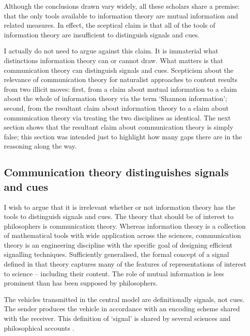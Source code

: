 Although the conclusions drawn vary widely, all these scholars share a premise: that the only tools available to information theory are mutual information and related measures.
In effect, the sceptical claim is that all of the tools of information theory are insufficient to distinguish signals and cues.

I actually do not need to argue against this claim.
It is immaterial what distinctions information theory can or cannot draw.
What matters is that communication theory can distinguish signals and cues.
Scepticism about the relevance of communication theory for naturalist approaches to content results from two illicit moves: first, from a claim about mutual information to a claim about the whole of information theory via the term `Shannon information'; second, from the resultant claim about information theory to a claim about communication theory via treating the two disciplines as identical.
The next section shows that the resultant claim about communication theory is simply false; this section was intended just to highlight how many gaps there are in the reasoning along the way.



\subsection{Communication theory distinguishes signals and cues}

I wish to argue that it is irrelevant whether or not information theory has the tools to distinguish signals and cues.
The theory that should be of interest to philosophers is communication theory.
Whereas information theory is a collection of mathematical tools with wide application across the sciences, communication theory is an engineering discipline with the specific goal of designing efficient signalling techniques.
Sufficiently generalised, the formal concept of a signal defined in that theory captures many of the features of representations of interest to science -- including their content.
The role of mutual information is less prominent than has been supposed by philosophers.

The vehicles transmitted in the central model are definitionally signals, not cues.
The sender produces the vehicle in accordance with an encoding scheme shared with the receiver.
This definition of `signal' is shared by several sciences \citep{shannon1948mathematicala,maynardsmith2003animal} and philosophical accounts \citep[$\S$6]{millikan2004varieties} \citep{bergstrom2011transmission}.

